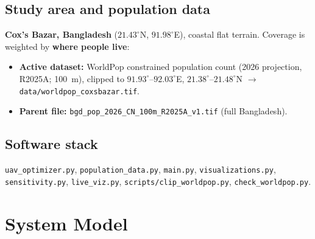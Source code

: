 \documentclass[11pt,a4paper]{article}
\begin{document}
\subsection{Study area and population data}
\textbf{Cox's Bazar, Bangladesh} ($21.43^\circ$N, $91.98^\circ$E), coastal flat terrain.
Coverage is weighted by \textbf{where people live}:
\begin{itemize}[noitemsep]
  \item \textbf{Active dataset:} WorldPop constrained population count (2026 projection,
        R2025A; 100~m), clipped to $91.93^\circ$--$92.03^\circ$E, $21.38^\circ$--$21.48^\circ$N
        $\rightarrow$ \texttt{data/worldpop\_coxsbazar.tif}.
  \item \textbf{Parent file:} \texttt{bgd\_pop\_2026\_CN\_100m\_R2025A\_v1.tif} (full Bangladesh).
\end{itemize}

\subsection{Software stack}
\texttt{uav\_optimizer.py}, \texttt{population\_data.py}, \texttt{main.py},
\texttt{visualizations.py}, \texttt{sensitivity.py}, \texttt{live\_viz.py},
\texttt{scripts/clip\_worldpop.py}, \texttt{check\_worldpop.py}.

\section{System Model}
\end{document}

